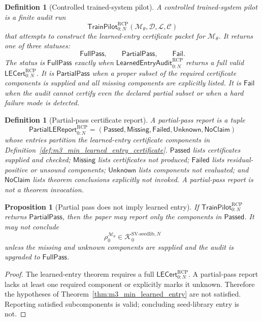 \documentclass[11pt]{article}
\newtheorem{proposition}[theorem]{Proposition}
\newtheorem{definition}[theorem]{Definition}
\newcommand{\1}{\mathbf{1}}
\newcommand{\RCP}{\mathrm{RCP}}
\providecommand{\Kcal}{\mathcal{K}}
\begin{document}
\begin{definition}[Controlled trained-system pilot]
\label{def:m3_min_controlled_trained_system_pilot}
A controlled trained-system pilot is a finite audit run
\[
\mathsf{TrainPilot}_{0:N}^{\RCP}(\mathcal M_\theta,\mathcal D,\mathcal L,\mathcal C)
\]
that attempts to construct the learned-entry certificate packet for \(\mathcal M_\theta\).  It returns one of three statuses:
\[
\mathsf{FullPass},\qquad \mathsf{PartialPass},\qquad \mathsf{Fail}.
\]
The status is \(\mathsf{FullPass}\) exactly when \(\mathsf{LearnedEntryAudit}_{0:N}^{\RCP}\) returns a full valid \(\mathsf{LECert}_{0:N}^{\RCP}\).  It is \(\mathsf{PartialPass}\) when a proper subset of the required certificate components is supplied and all missing components are explicitly listed.  It is \(\mathsf{Fail}\) when the audit cannot certify even the declared partial subset or when a hard failure mode is detected.
\end{definition}

\begin{definition}[Partial-pass certificate report]
\label{def:m3_min_partial_pass_report}
A partial-pass report is a tuple
\[
\mathsf{PartialLEReport}_{0:N}^{\RCP}
=(\mathsf{Passed},\mathsf{Missing},\mathsf{Failed},\mathsf{Unknown},\mathsf{NoClaim})
\]
whose entries partition the learned-entry certificate components in Definition~\ref{def:m3_min_learned_entry_certificate}.  \(\mathsf{Passed}\) lists certificates supplied and checked; \(\mathsf{Missing}\) lists certificates not produced; \(\mathsf{Failed}\) lists residual-positive or unsound components; \(\mathsf{Unknown}\) lists components not evaluated; and \(\mathsf{NoClaim}\) lists theorem conclusions explicitly not invoked.  A partial-pass report is not a theorem invocation.
\end{definition}

\begin{proposition}[Partial pass does not imply learned entry]
\label{prop:m3_min_partial_pass_not_entry}
If \(\mathsf{TrainPilot}_{0:N}^{\RCP}\) returns \(\mathsf{PartialPass}\), then the paper may report only the components in \(\mathsf{Passed}\).  It may not conclude
\[
\rho_0^{\mathcal M_\theta}
\in
\Kcal_0^{\mathrm{SV\mbox{-}seedlib},N}
\]
unless the missing and unknown components are supplied and the audit is upgraded to \(\mathsf{FullPass}\).
\end{proposition}

\begin{proof}
The learned-entry theorem requires a full \(\mathsf{LECert}_{0:N}^{\RCP}\).  A partial-pass report lacks at least one required component or explicitly marks it unknown.  Therefore the hypotheses of Theorem~\ref{thm:m3_min_learned_entry} are not satisfied.  Reporting satisfied subcomponents is valid; concluding seed-library entry is not.
\end{proof}
\end{document}
